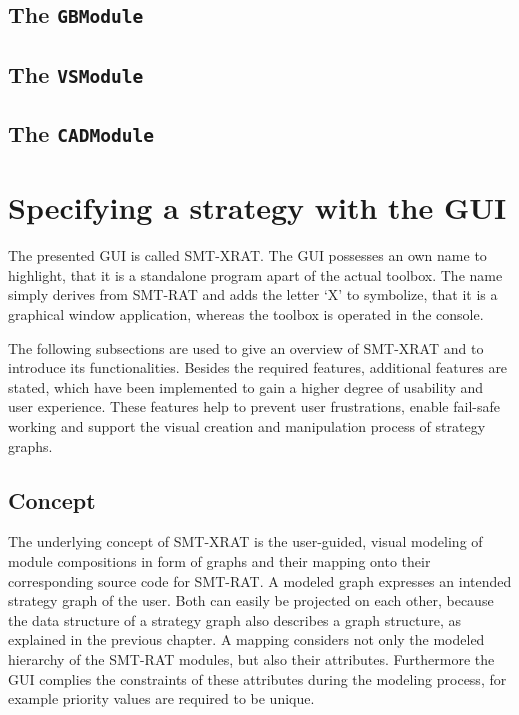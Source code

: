 \subsection{The \texttt{GBModule}}
\subsection{The \texttt{VSModule}}

\subsection{The \texttt{CADModule}}

\section{Specifying a strategy with the GUI}

The presented GUI is called SMT-XRAT. The GUI possesses an own name to highlight, that it is a standalone program apart of the actual toolbox. The name simply derives from SMT-RAT and adds the letter `X' to symbolize, that it is a graphical window application, whereas the toolbox is operated in the console.

The following subsections are used to give an overview of SMT-XRAT and to introduce its functionalities. Besides the required features, additional features are stated, which have been implemented to gain a higher degree of usability and user experience. These features help to prevent user frustrations, enable fail-safe working and support the visual creation and manipulation process of strategy graphs.

\subsection{Concept}
\label{sec:concept_of_smt-xrat}
The underlying concept of SMT-XRAT is the user-guided, visual modeling of module compositions in form of graphs and their mapping onto their corresponding source code for SMT-RAT. A modeled graph expresses an intended strategy graph of the user. Both can easily be projected on each other, because the data structure of a strategy graph also describes a graph structure, as explained in the previous chapter. A mapping considers not only the modeled hierarchy of the SMT-RAT modules, but also their attributes. Furthermore the GUI complies the constraints of these attributes during the modeling process, for example priority values are required to be unique.

